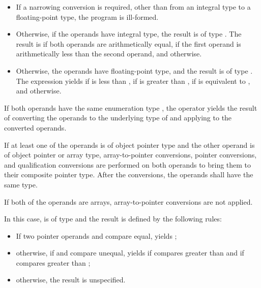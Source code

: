 \begin{itemize}
\item
If a narrowing conversion is required,
other than from an integral type to a floating-point type,
the program is ill-formed.

\item
Otherwise, if the operands have integral type,
the result is of type .
The result is
if both operands are arithmetically equal,
if the first operand is arithmetically
less than the second operand,
and
otherwise.
\item
Otherwise, the operands have floating-point type, and
the result is of type .
The expression  yields
if  is less than ,
if  is greater than ,
if  is equivalent to ,
and
 otherwise.
\end{itemize}

\pnum
If both operands have the same enumeration type ,
the operator yields the result of
converting the operands to the underlying type of 
and applying \tcode{<=>} to the converted operands.

\pnum
If at least one of the operands is of object pointer type and
the other operand is of object pointer or array type,
array-to-pointer conversions,
pointer conversions,
and
qualification conversions
are performed on both operands
to bring them to their composite pointer type.
After the conversions, the operands shall have the same type.
\begin{note}
If both of the operands are arrays,
array-to-pointer conversions are not applied.
\end{note}
In this case,
 is of type  and
the result is defined by the following rules:
\begin{itemize}
\item
If two pointer operands  and  compare equal,
 yields ;
\item
otherwise, if  and  compare unequal,
 yields
if  compares greater than 
and
if  compares greater than ;
\item
otherwise, the result is unspecified.
\end{itemize}


